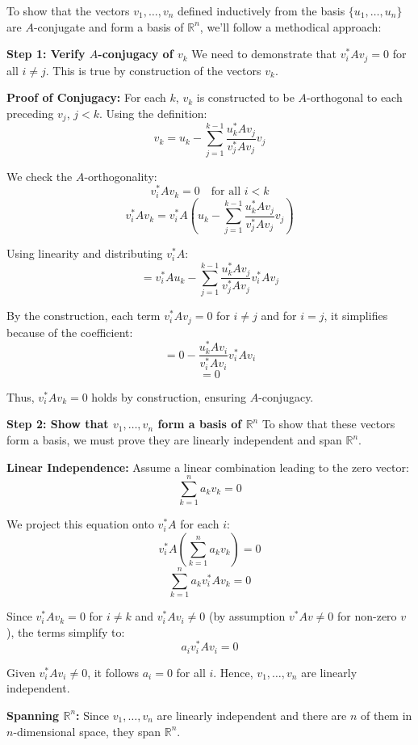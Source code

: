 \documentclass{article}
\begin{document}
To show that the vectors \(v_1, \ldots, v_n\) defined inductively from the basis \(\{u_1, \ldots, u_n\}\) are \(A\)-conjugate and form a basis of \(\mathbb{R}^n\), we'll follow a methodical approach:

\textbf{Step 1: Verify \(A\)-conjugacy of \(v_k\)}
We need to demonstrate that \(v_i^* A v_j = 0\) for all \(i \neq j\). This is true by construction of the vectors \(v_k\). 

\textbf{Proof of Conjugacy:}
For each \(k\), \(v_k\) is constructed to be \(A\)-orthogonal to each preceding \(v_j\), \(j < k\). Using the definition:
\[ v_k = u_k - \sum_{j=1}^{k-1} \frac{u_k^* A v_j}{v_j^* A v_j} v_j \]

We check the \(A\)-orthogonality:
\[ v_i^* A v_k = 0 \quad \text{for all } i < k \]
\[ v_i^* A v_k = v_i^* A \left( u_k - \sum_{j=1}^{k-1} \frac{u_k^* A v_j}{v_j^* A v_j} v_j \right) \]

Using linearity and distributing \(v_i^* A\):
\[ = v_i^* A u_k - \sum_{j=1}^{k-1} \frac{u_k^* A v_j}{v_j^* A v_j} v_i^* A v_j \]

By the construction, each term \(v_i^* A v_j = 0\) for \(i \neq j\) and for \(i = j\), it simplifies because of the coefficient:
\[ = 0 - \frac{u_k^* A v_i}{v_i^* A v_i} v_i^* A v_i \]
\[ = 0 \]

Thus, \(v_i^* A v_k = 0\) holds by construction, ensuring \(A\)-conjugacy.

\textbf{Step 2: Show that \(v_1, \ldots, v_n\) form a basis of \(\mathbb{R}^n\)}
To show that these vectors form a basis, we must prove they are linearly independent and span \(\mathbb{R}^n\).

\textbf{Linear Independence:}
Assume a linear combination leading to the zero vector:
\[ \sum_{k=1}^n a_k v_k = 0 \]

We project this equation onto \(v_i^* A\) for each \(i\):
\[ v_i^* A \left(\sum_{k=1}^n a_k v_k\right) = 0 \]
\[ \sum_{k=1}^n a_k v_i^* A v_k = 0 \]

Since \(v_i^* A v_k = 0\) for \(i \neq k\) and \(v_i^* A v_i \neq 0\) (by assumption \(v^* A v \neq 0\) for non-zero \(v\)), the terms simplify to:
\[ a_i v_i^* A v_i = 0 \]

Given \(v_i^* A v_i \neq 0\), it follows \(a_i = 0\) for all \(i\). Hence, \(v_1, \ldots, v_n\) are linearly independent.

\textbf{Spanning \(\mathbb{R}^n\):}
Since \(v_1, \ldots, v_n\) are linearly independent and there are \(n\) of them in \(n\)-dimensional space, they span \(\mathbb{R}^n\).
\end{document}

